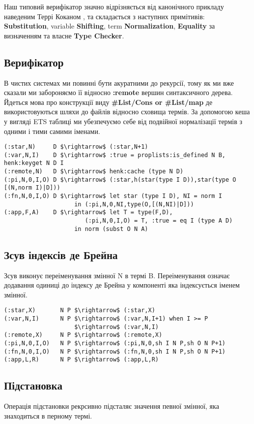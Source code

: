 \documentclass{article}
\begin{document}
Наш типовий верифікатор значно відрізняється від канонічного прикладу наведеним Террі Коканом \cite{Coq96},
та складається з наступних примітивів: {\bf Substitution}, variable {\bf Shifting}, term {\bf Normalization},
{\bf Equality} за визначенням та власне {\bf Type Checker}.

\subsection{Верифікатор}
В чистих системах ми повинні бути акуратними до рекурсії, тому як ми вже сказали ми забороняємо її
відносно {\bf :remote} вершин синтаксичного дерева. Йдеться мова про конструкції виду
{\bf \#List/Cons or \#List/map} де використовуються шляхи до файлів відносно сховища термів.
За допомогою кеша у вигляді ETS таблиці ми убезпечуємо себе від подвійної нормалізації термів з одними і тими самими іменами.

\begin{lstlisting}[mathescape=true]
(:star,N)     D $\rightarrow$ (:star,N+1)
(:var,N,I)    D $\rightarrow$ :true = proplists:is_defined N B, henk:keyget N D I
(:remote,N)   D $\rightarrow$ henk:cache (type N D)
(:pi,N,0,I,O) D $\rightarrow$ (:star,h(star(type I D)),star(type O [(N,norm I)|D]))
(:fn,N,0,I,O) D $\rightarrow$ let star (type I D), NI = norm I
                    in (:pi,N,0,NI,type(O,[(N,NI)|D]))
(:app,F,A)    D $\rightarrow$ let T = type(F,D),
                       (:pi,N,0,I,O) = T, :true = eq I (type A D)
                    in norm (subst O N A)
\end{lstlisting}

\subsection{Зсув індексів де Брейна}
Зсув виконує переіменування змінної N в термі B. Переіменування означає додавання одиниці до індексу де Брейна у компоненті яка індексується іменем змінної.

\begin{lstlisting}[mathescape=true]
(:star,X)       N P $\rightarrow$ (:star,X)
(:var,N,I)      N P $\rightarrow$ (:var,N,I+1) when I >= P
                    $\rightarrow$ (:var,N,I)
(:remote,X)     N P $\rightarrow$ (:remote,X)
(:pi,N,0,I,O)   N P $\rightarrow$ (:pi,N,0,sh I N P,sh O N P+1)
(:fn,N,0,I,O)   N P $\rightarrow$ (:fn,N,0,sh I N P,sh O N P+1)
(:app,L,R)      N P $\rightarrow$ (:app,L,R)
\end{lstlisting}

\subsection{Підстановка}
Операція підстановки рекрсивно підсталяє значення певної змінної, яка знаходиться в перному термі.
\end{document}

